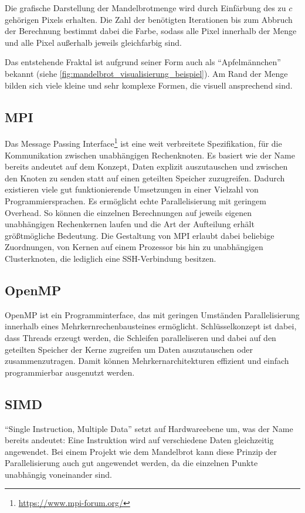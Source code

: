 Die grafische Darstellung der Mandelbrotmenge wird durch Einfärbung des zu $c$ gehörigen Pixels erhalten.
Die Zahl der benötigten Iterationen bis zum Abbruch der Berechnung bestimmt dabei die Farbe, sodass alle Pixel
innerhalb der Menge und alle Pixel außerhalb jeweils gleichfarbig sind.

Das entstehende Fraktal ist aufgrund seiner Form auch als “Apfelmännchen” bekannt (siehe \autoref{fig:mandelbrot_visualisierung_beispiel}).
Am Rand der Menge bilden sich viele kleine und sehr komplexe Formen, die visuell ansprechend sind.

\subsection{MPI}
Das Message Passing Interface\footnote{\url{https://www.mpi-forum.org/}} ist eine weit verbreitete Spezifikation, für die Kommunikation zwischen unabhängigen Rechenknoten.
Es basiert wie der Name bereits andeutet auf dem Konzept, Daten explizit auszutauschen und zwischen den Knoten zu senden statt auf einen geteilten Speicher zuzugreifen.
Dadurch existieren viele gut funktionierende Umsetzungen in einer Vielzahl von Programmiersprachen.
Es ermöglicht echte Parallelisierung mit geringem Overhead.
So können die einzelnen Berechnungen auf jeweils eigenen unabhängigen Rechenkernen laufen und
die Art der Aufteilung erhält größtmögliche Bedeutung.
Die Gestaltung von MPI erlaubt dabei beliebige Zuordnungen, von Kernen auf einem Prozessor bis hin zu unabhängigen Clusterknoten, die lediglich eine SSH-Verbindung besitzen.

\subsection{OpenMP}

OpenMP ist ein Programminterface, das mit geringen Umständen Parallelisierung innerhalb eines Mehrkernrechenbausteines
ermöglicht.
Schlüsselkonzept ist dabei, dass Threads erzeugt werden, die Schleifen paralleliseren und dabei auf den geteilten Speicher
der Kerne zugreifen um Daten auszutauschen oder zusammenzutragen.
Damit können Mehrkernarchitekturen effizient und einfach programmierbar ausgenutzt werden.

\subsection{SIMD} \label{par:introduction_simd}
\enquote{Single Instruction, Multiple Data} setzt auf Hardwareebene um, was der Name bereits andeutet:
Eine Instruktion wird auf verschiedene Daten gleichzeitig angewendet.
Bei einem Projekt wie dem Mandelbrot kann diese Prinzip der Parallelisierung auch gut angewendet werden,
da die einzelnen Punkte unabhängig voneinander sind.

